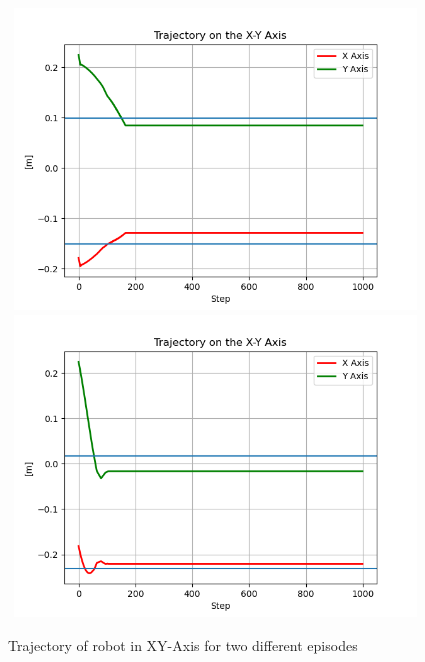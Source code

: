 \documentclass[12pt,twoside,a4]{mwbk}
\begin{document}
\begin{figure}[h!]
    \centering
    \includegraphics[width=11cm, height=8cm]{traj_x_y_2.png}
    \includegraphics[width=11cm, height=8cm]{traj_x_y.png}
    \caption{Trajectory of robot in XY-Axis for two different episodes}
\end{figure}
\end{document}
